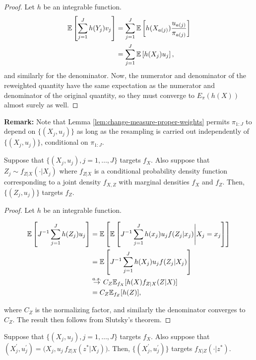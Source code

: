 \documentclass{article}
\begin{document}
\begin{proof}
    Let $h$ be an integrable function. 
    \begin{align*}
        \mathbb{E}\left[\sum_{j=1}^J h(Y_j) v_j\right] 
        &= \sum_{j=1}^J \mathbb{E}\left[h(X_{a(j)}) \frac{u_{a(j)}}{\pi_{a(j)}}\right] \\
        &= \sum_{j=1}^J \mathbb{E}\left[h(X_{j}) u_{j}\right],
    \end{align*}
    and similarly for the denominator. Now, the numerator and denominator of the reweighted quantity have the same expectation as the numerator and denominator of the original quantity, so they must converge to $ E_\pi(h(X))$ almost surely as well. 
\end{proof}


\textbf{Remark:} Note that Lemma \ref{lem:change-measure-proper-weights} permits $\pi_{1:J}$ to depend on $\{(X_j,u_j)\}$ as long as the resampling is carried out independently of $\{(X_j,u_j)\}$, conditional on $\pi_{1:J}$.

\begin{lem}
    \label{lem:marginal-proper-weights}
    Suppose that $\{(X_j,u_j),j=1,\dots,J\}$ targets $f_X$. Also suppose that $Z_j \sim f_{Z|X}(\cdot | X_j)$ where $f_{Z|X}$ is a conditional probability density function corresponding to a joint density $f_{X,Z}$ with marginal densities $f_X$ and $f_Z$. Then, $\{(Z_j,u_j)\}$ targets $f_Z$.
\end{lem}
\begin{proof}
    Let $h$ be an integrable function. 

    \begin{align*}
        \mathbb{E}\left[J^{-1}\sum_{j=1}^J h(Z_j) u_j\right] &= \mathbb{E}\left[\mathbb{E}\left[J^{-1}\sum_{j=1}^J h(x_j) u_j f(Z_j|x_j)\Bigg| X_j=x_j\right]\right] \\
        &= \mathbb{E}\left[J^{-1}\sum_{j=1}^J h(X_j) u_j f(Z_j|X_j)\right] \\
        &\stackrel{a.s.}{\to} C_Z \mathbb{E}_{f_X}[h(X) f_{Z|X}(Z|X)] \\
        &= C_Z \mathbb{E}_{f_Z}[h(Z)],
    \end{align*}

    where $C_Z$ is the normalizing factor, and similarly the denominator converges to $C_Z$. The result then follows from Slutsky's theorem. 
    
\end{proof}

\begin{lem}
    \label{lem:posterior-proper-weights}
    Suppose that $\{(X_j,u_j),j=1,\dots,J\}$ targets $f_X$. Also suppose that $(X^\prime_j,u^\prime_j) = \big(X_j,u_j\, f_{Z|X}(z^*|X_j)\big)$. Then, $\{(X^\prime_j,u^\prime_j)\}$ targets $f_{X|Z}(\cdot | z^*)$.
\end{lem}
\end{document}
